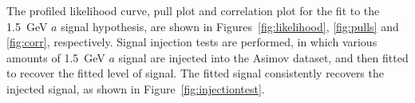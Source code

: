 \documentclass[NOTE, atlasdraft=true, texlive=2017, UKenglish]{\ATLASLATEXPATH atlasdoc}
\begin{document}

The profiled likelihood curve, pull plot and correlation plot for the fit to the 1.5~GeV $a$ signal hypothesis, are shown in Figures~\ref{fig:likelihood}, \ref{fig:pulls} and \ref{fig:corr}, respectively. Signal injection tests are performed, in which various amounts of 1.5~GeV $a$ signal are injected into the Asimov dataset, and then fitted to recover the fitted level of signal. The fitted signal consistently recovers the injected signal, as shown in Figure~\ref{fig:injectiontest}. %

\end{document}
